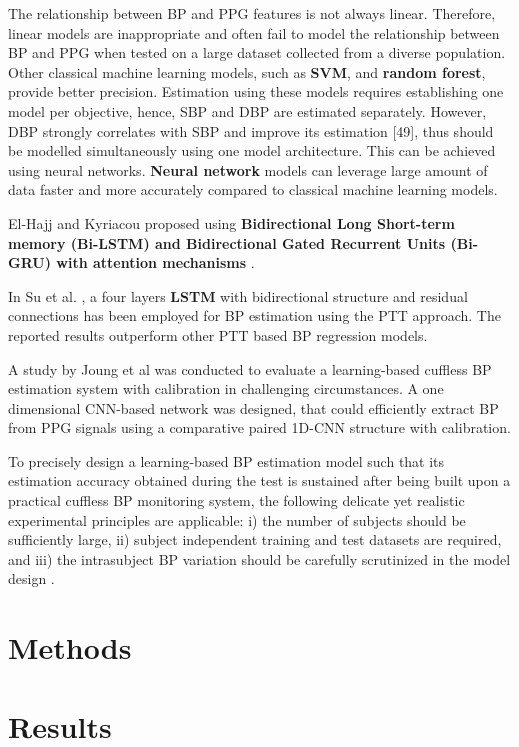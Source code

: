 \documentclass[10pt, bibliography=totoc]{scrartcl}
\begin{document}
The relationship between BP and PPG features is not always linear. Therefore, linear models are inappropriate and often fail to model the relationship between BP and PPG when tested on a large dataset collected from a diverse population. Other classical machine learning models, such as \textbf{SVM}, and \textbf{random forest}, provide better precision. Estimation using these models requires establishing one model per objective, hence, SBP and DBP are estimated separately. However, DBP strongly correlates with SBP and improve its estimation [49], thus should be modelled simultaneously using one model architecture. This can be achieved using neural networks. \textbf{Neural network} models can leverage large amount of data faster and more accurately compared to classical machine learning models.

El-Hajj and Kyriacou proposed using \textbf{Bidirectional Long Short-term memory (Bi-LSTM) and Bidirectional Gated Recurrent Units (Bi-GRU) with attention mechanisms} \cite{el-hajjDeepLearningModels2021}.

In Su et al. \cite{suLongtermBloodPressure2018}, a four layers \textbf{LSTM} with bidirectional structure and residual connections has been employed for BP estimation using the PTT approach. The reported results outperform other PTT based BP regression models.

A study by Joung et al \cite{joungContinuousCufflessBlood2023} was conducted to evaluate a learning-based cuffless BP estimation system with calibration in challenging circumstances. A one dimensional CNN-based network was designed, that could efficiently extract BP from PPG signals using a comparative paired 1D-CNN structure with calibration. 

To precisely design a learning-based BP estimation model such that its estimation accuracy obtained during the test is sustained after being built upon a practical cuffless BP monitoring system, the following delicate yet realistic experimental principles are applicable: i) the number of subjects should be sufficiently large, ii) subject independent training and test datasets are required, and iii) the intrasubject BP variation should be carefully scrutinized in the model design \cite{joungContinuousCufflessBlood2023}.

\section{Methods}
\section{Results}
\end{document}
